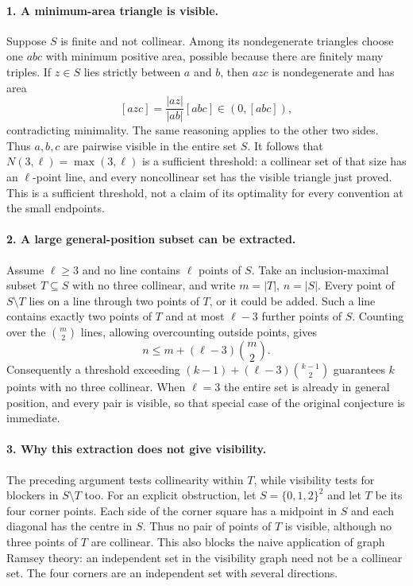 \documentclass[11pt,a4paper]{article}
\begin{document}
\paragraph{1. A minimum-area triangle is visible.}
Suppose $S$ is finite and not collinear. Among its nondegenerate
triangles choose one $abc$ with minimum positive area, possible because
there are finitely many triples. If $z\in S$ lies strictly between
$a$ and $b$, then $azc$ is nondegenerate and has area
\[
 [azc]=\frac{|az|}{|ab|}[abc]\in(0,[abc]),
\]
contradicting minimality. The same reasoning applies to the other two
sides. Thus $a,b,c$ are pairwise visible in the entire set $S$.
It follows that $N(3,\ell)=\max(3,\ell)$ is a sufficient threshold:
a collinear set of that size has an $\ell$-point line, and every
noncollinear set has the visible triangle just proved.
This is a sufficient threshold, not a claim of its optimality for
every convention at the small endpoints.

\paragraph{2. A large general-position subset can be extracted.}
Assume $\ell\ge3$ and no line contains $\ell$ points of $S$.
Take an inclusion-maximal subset $T\subseteq S$ with no three
collinear, and write $m=|T|$, $n=|S|$. Every point of $S\setminus T$
lies on a line through two points of $T$, or it could be added.
Such a line contains exactly two points of $T$ and at most
$\ell-3$ further points of $S$. Counting over the $\binom m2$
lines, allowing overcounting outside points, gives
\[
 n\le m+(\ell-3)\binom m2.
\]
Consequently a threshold exceeding
$(k-1)+(\ell-3)\binom{k-1}{2}$ guarantees $k$ points with no three
collinear. When $\ell=3$ the entire set is already in general
position, and every pair is visible, so that special case of the
original conjecture is immediate.

\paragraph{3. Why this extraction does not give visibility.}
The preceding argument tests collinearity within $T$, while visibility
tests for blockers in $S\setminus T$ too. For an explicit obstruction,
let $S=\{0,1,2\}^2$ and let $T$ be its four corner points. Each
side of the corner square has a midpoint in $S$ and each diagonal
has the centre in $S$. Thus no pair of points of $T$ is visible,
although no three points of $T$ are collinear. This also blocks the
naive application of graph Ramsey theory: an independent set in the
visibility graph need not be a collinear set. The four corners are
an independent set with several directions.
\end{document}
